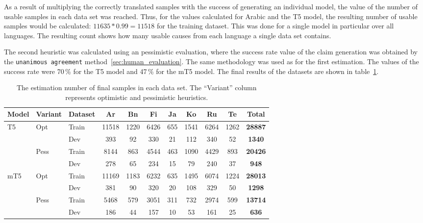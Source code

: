 As a result of multiplying the correctly translated samples with the success of generating an individual model, the value of the number of usable samples in each data set was reached. Thus, for the values calculated for Arabic and the T5 model, the resulting number of usable samples would be calculated: $11635 * 0.99 = 11518$ for the training dataset. This was done for a single model in particular over all languages. The resulting count shows how many usable causes from each language a single data set contains.

The second heuristic was calculated using an pessimistic evaluation, where the success rate value of the claim generation was obtained by the \texttt{unanimous agreement} method~\ref{sec:human_evaluation}. The same methodology was used as for the first estimation. The values of the success rate were 70\,\% for the T5 model and 47\,\% for the mT5 model. The final results of the datasets are shown in table~\ref{tab:result_data_size}.




\begin{table}[H]
    \centering
    \begin{tabular}{l|l|lccccccc|c}
        \hline
        Model & Variant & Dataset & Ar & Bn & Fi & Ja & Ko & Ru & Te & Total \\
        \hline
        \multirow{4}{*}{T5} & \multirow{2}{*}{Opt} & Train & 11518 & 1220 & 6426 & 655 & 1541 & 6264 & 1262 & \textbf{28887} \\
         & & Dev  & 393 & 92 & 330 & 21 & 112 & 340 & 52 & \textbf{1340}\\
         \cline{3-11}
         & \multirow{2}{*}{Pess} & Train  & 8144 & 863 & 4544 & 463 & 1090 & 4429 & 893 & \textbf{20426} \\
         & & Dev  & 278 & 65 & 234 & 15 & 79 & 240 & 37 & \textbf{948}\\
        \hline
        \multirow{4}{*}{mT5} & \multirow{2}{*}{Opt} & Train & 11169 & 1183 & 6232 & 635 & 1495 & 6074 & 1224 & \textbf{28013} \\
         & & Dev  & 381 & 90 & 320 & 20 & 108 & 329 & 50 & \textbf{1298}\\
         \cline{3-11}
         & \multirow{2}{*}{Pess} & Train & 5468 & 579 & 3051 & 311 & 732 & 2974 & 599 & \textbf{13714} \\
         & & Dev  & 186 & 44 & 157 & 10 & 53 & 161 & 25 & \textbf{636}\\
        \hline
    \end{tabular}
    \caption{The estimation number of final samples in each data set. The ``Variant'' column represents optimistic and pessimistic heuristics.}
    \label{tab:result_data_size}
\end{table}

